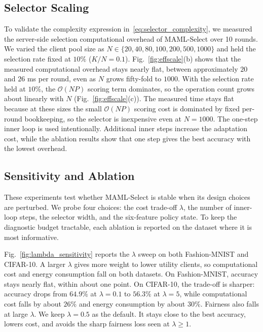 \documentclass[journal]{IEEEtran}
\newcommand{\revision}[1]{#1}
\begin{document}
\subsection{\revision{Selector Scaling}}
\revision{To validate the complexity expression in~\eqref{eq:selector_complexity}, we measured the server-side selection computational overhead of MAML-Select over 10 rounds. We varied the client pool size as $N\in\{20,40,80,100,200,500,1000\}$ and held the selection rate fixed at $10\%$ ($K/N=0.1$). Fig.~\ref{fig:effscale}(b) shows that the measured computational overhead stays nearly flat, between approximately $20$ and $26$ ms per round, even as $N$ grows fifty-fold to $1000$.
With the selection rate held at $10\%$, the $\mathcal{O}(NP)$ scoring term dominates, so the operation count grows about linearly with $N$ (Fig.~\ref{fig:effscale}(c)). The measured time stays flat because at these sizes the small $\mathcal{O}(NP)$ scoring cost is dominated by fixed per-round bookkeeping, so the selector is inexpensive even at $N=1000$. The one-step inner loop is used intentionally. Additional inner steps increase the adaptation cost, while the ablation results show that one step gives the best accuracy with the lowest overhead.}

\subsection{\revision{Sensitivity and Ablation}}
\revision{These experiments test whether MAML-Select is stable when its design choices are perturbed. We probe four choices: the cost trade-off $\lambda$, the number of inner-loop steps, the selector width, and the six-feature policy state. To keep the diagnostic budget tractable, each ablation is reported on the dataset where it is most informative.}

\revision{Fig.~\ref{fig:lambda_sensitivity} reports the $\lambda$ sweep on both Fashion-MNIST and CIFAR-10. A larger $\lambda$ gives more weight to lower utility clients, so computational cost and energy consumption fall on both datasets. On Fashion-MNIST, accuracy stays nearly flat, within about one point. On CIFAR-10, the trade-off is sharper: accuracy drops from $64.9\%$ at $\lambda=0.1$ to $56.3\%$ at $\lambda=5$, while computational cost falls by about $26\%$ and energy consumption by about $30\%$. Fairness also falls at large $\lambda$. We keep $\lambda=0.5$ as the default. It stays close to the best accuracy, lowers cost, and avoids the sharp fairness loss seen at $\lambda\ge1$.}
\end{document}
